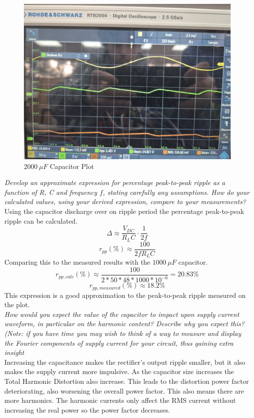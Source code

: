 \documentclass[12pt,a4paper]{article}
\begin{document}
\begin{figure}[H]
        \centering
	\includegraphics[width=0.7\columnwidth]{Images/20250828_135318.jpg}
	\caption{$2000\:\mu F$ Capacitor Plot}
	\label{fig:2000F Cap Plot}
\end{figure}


\textit{Develop an approximate expression for percentage peak-to-peak ripple as a function of R, C and frequency $f$, stating carefully any assumptions. How do your calculated values, using your derived expression, compare to your measurements?}\\

Using the capacitor discharge over on ripple period the percentage peak-to-peak ripple can be calculated.
$$\Delta\approx\dfrac{V_{DC}}{R_LC}\cdot\dfrac{1}{2f}$$
$$r_{pp}(\%)\approx\dfrac{100}{2fR_LC}$$
Comparing this to the measured results with the $1000\:\mu F$ capacitor.
$$r_{pp,calc}(\%)\approx\dfrac{100}{2*50*48*1000*10^{-6}}=20.83\%$$
$$r_{pp,measured}(\%)\approx18.2\%$$
This expression is a good approximation to the peak-to-peak ripple measured on the plot.\\

\textit{How would you expect the value of the capacitor to impact upon supply current waveform, in particular on the harmonic content? Describe why you expect this? (Note: if you have time you may wish to think of a way to measure and display the Fourier components of supply current for your circuit, thus gaining extra insight}\\

Increasing the capacitance makes the rectifier's output ripple smaller, but it also makes the supply current more impulsive. As the capacitor size increases the Total Harmonic Distortion also increase. This leads to the distortion power factor deteriorating, also worsening the overall power factor. This also means there are more harmonics. The harmonic currents only affect the RMS current without increasing the real power so the power factor decreases.\\ 
\end{document}
